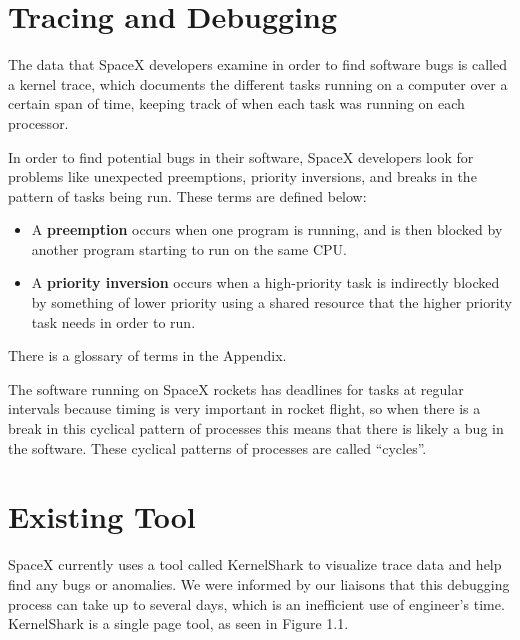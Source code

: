 \documentclass{hmcclinic}
\begin{document}
\section{Tracing and Debugging}

The data that SpaceX developers examine in order to find software bugs is called
a kernel trace, which documents the different tasks running on a computer over a
certain span of time, keeping track of when each task was running on each processor. 

In order to find potential bugs in their software, SpaceX developers look for
problems like unexpected preemptions, priority inversions, and breaks in the
pattern of tasks being run. These terms are defined below:
\begin{itemize}
\item A {\bf preemption} occurs when one program is running, and
is then blocked by another program starting to run on the same CPU. 
\item A {\bf priority
inversion} occurs when a high-priority task is indirectly blocked by something of
lower priority using a shared resource that the higher priority task needs in
order to run. 
\end{itemize}

There is a glossary of terms in the Appendix.

The software running on SpaceX rockets has deadlines for tasks at regular intervals because timing is very important in rocket flight, so when there is a break in this cyclical pattern of processes this means that there is likely a bug in the software. These cyclical patterns of processes are called ``cycles''.
\section{Existing Tool}
SpaceX currently uses a tool called KernelShark to visualize trace data and help find any bugs or anomalies. 
We were informed by our liaisons that this debugging process can take up to several days, 
which is an inefficient use of engineer's time. KernelShark is a single page tool, as seen in Figure 1.1.\\
\end{document}
